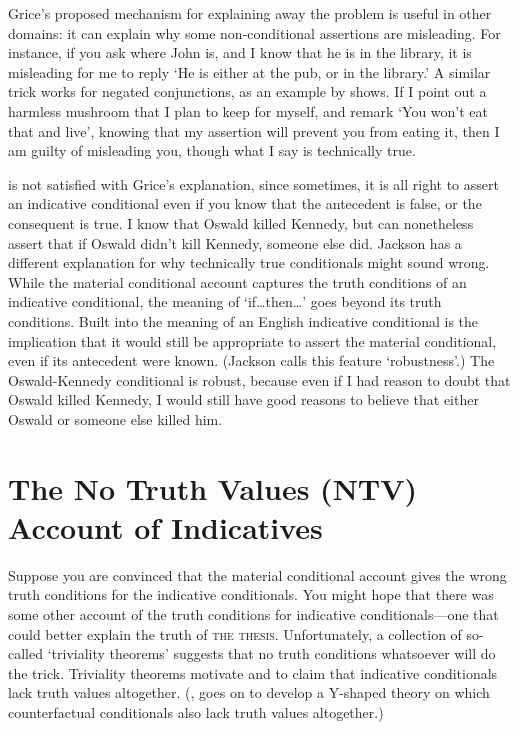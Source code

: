 Grice's proposed mechanism for explaining away the problem is useful in other domains: it can explain why some non-conditional assertions are misleading.  For instance, if you ask where John is, and I know that he is in the library, it is misleading for me to reply `He is either at the pub, or in the library.'  A similar trick works for negated conjunctions, as an example by \citet{lewis-conditional-i} shows.  If I point out a harmless mushroom that I plan to keep for myself, and remark `You won't eat that and live', knowing that my assertion will prevent you from eating it, then I am guilty of misleading you, though what I say is technically true.

\citet{jackson} is not satisfied with Grice's explanation, since sometimes, it is all right to assert an indicative conditional even if you know that the antecedent is false, or the consequent is true.  I know that Oswald killed Kennedy, but can nonetheless assert that if Oswald didn't kill Kennedy, someone else did.  Jackson has a different explanation for why technically true conditionals might sound wrong.  While the material conditional account captures the truth conditions of an indicative conditional,  the meaning of `if\ldots then\ldots' goes beyond its truth conditions.  Built into the meaning of an English indicative conditional is the implication that it would still be appropriate to assert the material conditional, even if its antecedent were known.  (Jackson calls this feature `robustness'.)  The Oswald-Kennedy conditional is robust, because even if I had reason to doubt that Oswald killed Kennedy, I would still have good reasons to believe that either Oswald or someone else killed him.

\section{The No Truth Values (NTV) Account of Indicatives}
\label{ntv}

Suppose you are convinced that the material conditional account gives the wrong truth conditions for the indicative conditionals.  You might hope that there was some other account of the truth conditions for indicative conditionals---one that could better explain the truth of \textsc{the thesis}.  Unfortunately, a collection of so-called `triviality theorems' suggests that no truth conditions whatsoever will do the trick.  Triviality theorems motivate  \citet{Edgington1986-EDGDCH, edgington-conditionals} and \citet{appiah-assertion} to claim that indicative conditionals lack truth values altogether.  (\citealp{Edgington2008-EDGI}, goes on to develop a Y-shaped theory on which counterfactual conditionals also lack truth values altogether.)

